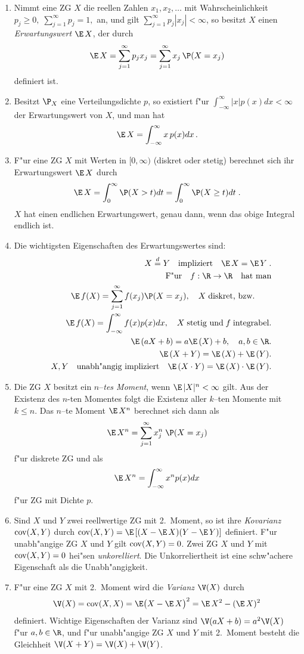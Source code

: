 \begin{enumerate}
\item
Nimmt eine ZG $X$ die reellen Zahlen $x_1,x_2,\ldots$ mit
Wahrscheinlichkeit\\
$p_j\ge 0,\;\sum_{j=1}^\infty p_j=1,$ an, und gilt
$\sum_{j=1}^\infty p_j |x_j|<\infty$, so besitzt $X$ einen {\it
Erwartungswert} ${\E}\,X$, der durch
\[{\E}\,X=\sum_{j=1}^\infty p_j x_j =\sum_{j=1}^\infty x_j\,\P(X=x_j)\]
definiert ist.
\item
Besitzt $\P_X$ eine Verteilungsdichte $p$, so existiert f"ur
$\int_{-\infty}^\infty |x|p(x)dx<\infty$ der Erwartungswert von $X$,
und man hat
\[{\E}\,X=\int_{-\infty}^\infty x\, p(x)dx\,.\]
\item
F"ur eine ZG $X$ mit Werten in $[0,\infty)$ (diskret oder stetig)
berechnet sich ihr Erwartungswert ${\E}\,X$ durch
\[{\E}\,X=\int_0^\infty \P(X>t)dt= \int_0^\infty \P(X\ge t)dt\;.\]
$X$ hat einen endlichen Erwartungswert, genau dann, wenn das obige
Integral endlich ist.
\item
Die wichtigsten Eigenschaften des Erwartungswertes sind:
\begin{eqnarray*}
&&X\stackrel{d}{=} Y\quad \mbox{impliziert}\quad \E\, X= \E\, Y\;.\\
&&\mbox{F"ur}\quad f:\R\to\R\quad \mbox{hat man}\\
&&\E\, f(X)=\sum_{j=1}^\infty f(x_j)\P(X=x_j),\quad X\;\mbox{diskret, bzw.}\qquad\\
&&\E\, f(X)=\int_{-\infty}^\infty f(x) p(x) dx,\quad X\;\mbox{stetig
und}
\; f\;\mbox{integrabel}.\\
&& \E\,(aX+b)=a\E\,(X)+b,\quad a,b\in\R.\\
&&\E\,(X+Y)=\E\,(X)+\E\,(Y).\\
&& X,Y\quad\mbox{unabh"angig impliziert}\quad \E\,(X\cdot
Y)=\E\,(X)\cdot \E\,(Y).
\end{eqnarray*}
\item
Die ZG $X$ besitzt ein $n$--{\it tes Moment}, wenn
$\E\,|X|^n<\infty$ gilt. Aus der Existenz des $n$-ten Momentes folgt
die Existenz aller $k$--ten Momente mit $k\le n$. Das $n$--te Moment
${\E}\,X^n$ berechnet sich dann als
\[{\E}\,X^n=\sum_{j=1}^\infty x_j^n\; \P(X=x_j)\]
f"ur diskrete ZG und als
\[{\E}\,X^n=\int_{-\infty}^\infty x^n p(x)dx\]
f"ur ZG mit Dichte $p$.
\item
Sind $X$ und $Y$ zwei reellwertige ZG mit 2.~Moment, so ist ihre
{\it Kovarianz}
 ${\rm cov}(X,Y)$ durch ${\rm cov}(X,Y)=\E\,
[(X-\E\,X)(Y-\E\,Y)]$ definiert. F"ur unabh"angige ZG $X$ und $Y$
gilt ${\rm cov}(X,Y)=0$. Zwei ZG $X$ und $Y$ mit ${\rm cov}(X,Y)=0$
hei"sen {\it unkorelliert}. Die Unkorreliertheit ist eine
schw"achere Eigenschaft als die Unabh"angigkeit.
\item
F"ur eine ZG $X$ mit 2.~Moment wird die {\it Varianz} $\V(X)$ durch
\[\V(X)={\rm cov}(X,X)={\E}\big(X-{\E}\,X\big)^2
={\E}\,X^2-({\E}\,X)^2\] definiert. Wichtige  Eigenschaften der
Varianz sind $\V(a X+b)= a^2\V(X)$ f"ur $a,b\in\R$, und f"ur
unabh"angige ZG $X$ und $Y$ mit 2.~Moment besteht die Gleichheit
$\V(X+Y)= \V(X)+\V(Y)$.
\end{enumerate}
